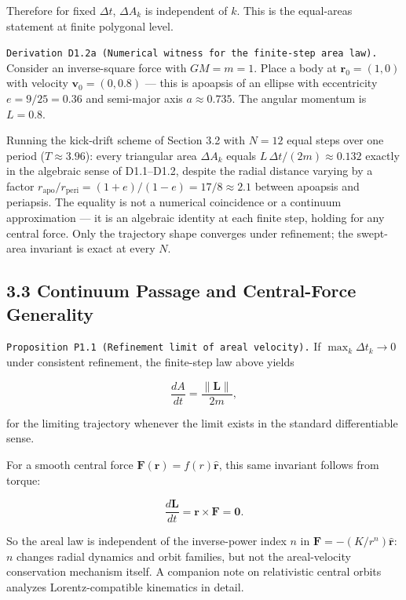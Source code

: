 \documentclass[
]{article}
\begin{document}
Therefore for fixed \(\Delta t\), \(\Delta A_k\) is independent of
\(k\). This is the equal-areas statement at finite polygonal level.

\texttt{Derivation\ D1.2a\ (Numerical\ witness\ for\ the\ finite-step\ area\ law).}
Consider an inverse-square force with \(GM=m=1\). Place a body at
\(\mathbf r_0=(1,0)\) with velocity \(\mathbf v_0=(0,0.8)\) --- this is
apoapsis of an ellipse with eccentricity \(e=9/25=0.36\) and semi-major
axis \(a\approx 0.735\). The angular momentum is \(L=0.8\).

Running the kick-drift scheme of Section 3.2 with \(N=12\) equal steps
over one period (\(T\approx 3.96\)): every triangular area
\(\Delta A_k\) equals \(L\,\Delta t/(2m)\approx 0.132\) exactly in the
algebraic sense of D1.1--D1.2, despite the radial distance varying by a
factor
\(r_{\mathrm{apo}}/r_{\mathrm{peri}}=(1+e)/(1-e)=17/8\approx 2.1\)
between apoapsis and periapsis. The equality is not a numerical
coincidence or a continuum approximation --- it is an algebraic identity
at each finite step, holding for any central force. Only the trajectory
shape converges under refinement; the swept-area invariant is exact at
every \(N\).

\hypertarget{continuum-passage-and-central-force-generality}{%
\subsection{3.3 Continuum Passage and Central-Force
Generality}\label{continuum-passage-and-central-force-generality}}

\texttt{Proposition\ P1.1\ (Refinement\ limit\ of\ areal\ velocity).} If
\(\max_k \Delta t_k\to 0\) under consistent refinement, the finite-step
law above yields

\[
\frac{dA}{dt}=\frac{\|\mathbf L\|}{2m},
\]

for the limiting trajectory whenever the limit exists in the standard
differentiable sense.

For a smooth central force \(\mathbf F(\mathbf r)=f(r)\hat{\mathbf r}\),
this same invariant follows from torque:

\[
\frac{d\mathbf L}{dt}=\mathbf r\times \mathbf F=\mathbf 0.
\]

So the areal law is independent of the inverse-power index \(n\) in
\(\mathbf F=-(K/r^n)\hat{\mathbf r}\): \(n\) changes radial dynamics and
orbit families, but not the areal-velocity conservation mechanism
itself. A companion note on relativistic central orbits analyzes
Lorentz-compatible kinematics in detail.
\end{document}
